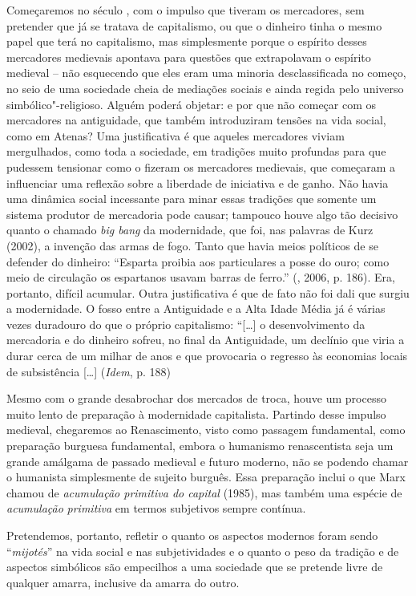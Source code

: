 Começaremos no século , com o impulso que tiveram os mercadores, sem
pretender que já se tratava de capitalismo, ou que o dinheiro tinha o
mesmo papel que terá no capitalismo, mas simplesmente porque o espírito
desses mercadores medievais apontava para questões que extrapolavam o
espírito medieval -- não esquecendo que eles eram uma minoria
desclassificada no começo, no seio de uma sociedade cheia de mediações
sociais e ainda regida pelo universo simbólico"-religioso. Alguém poderá
objetar: e por que não começar com os mercadores na antiguidade, que
também introduziram tensões na vida social, como em Atenas? Uma
justificativa é que aqueles mercadores viviam mergulhados, como toda a
sociedade, em tradições muito profundas para que pudessem tensionar como
o fizeram os mercadores medievais, que começaram a influenciar uma
reflexão sobre a liberdade de iniciativa e de ganho. Não havia uma
dinâmica social incessante para minar essas tradições que somente um
sistema produtor de mercadoria pode causar; tampouco houve algo tão
decisivo quanto o chamado \emph{big bang} da modernidade, que foi, nas
palavras de Kurz (2002), a invenção das armas de fogo. Tanto que havia
meios políticos de se defender do dinheiro: ``Esparta proibia aos
particulares a posse do ouro; como meio de circulação os espartanos
usavam barras de ferro.'' (, 2006, p. 186). Era, portanto, difícil
acumular. Outra justificativa é que de fato não foi dali que surgiu a
modernidade. O fosso entre a Antiguidade e a Alta Idade Média já é
várias vezes duradouro do que o próprio capitalismo: ``[\ldots{}] o
desenvolvimento da mercadoria e do dinheiro sofreu, no final da
Antiguidade, um declínio que viria a durar cerca de um milhar de anos e
que provocaria o regresso às economias locais de subsistência [\ldots{}]
(\emph{Idem}, p. 188)

Mesmo com o grande desabrochar dos mercados de troca, houve um processo
muito lento de preparação à modernidade capitalista. Partindo desse
impulso medieval, chegaremos ao Renascimento, visto como passagem
fundamental, como preparação burguesa fundamental, embora o humanismo
renascentista seja um grande amálgama de passado medieval e futuro
moderno, não se podendo chamar o humanista simplesmente de sujeito
burguês. Essa preparação inclui o que Marx chamou de \emph{acumulação
primitiva do capital} (1985), mas também uma espécie de
\emph{acumulação} \emph{primitiva} em termos subjetivos sempre contínua.

Pretendemos, portanto, refletir o quanto os aspectos modernos foram
sendo ``\emph{mijotés}'' na vida social e nas subjetividades e o quanto
o peso da tradição e de aspectos simbólicos são empecilhos a uma
sociedade que se pretende livre de qualquer amarra, inclusive da amarra
do outro.

